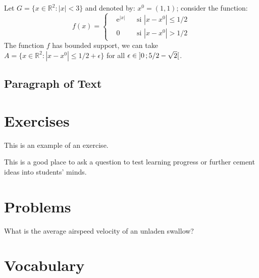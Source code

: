 \documentclass[11pt,fleqn]{book} %
\begin{document}
{\begin{example}
Let $G=\{x\in\mathbb{R}^2:|x|<3\}$ and denoted by: $x^0=(1,1)$; consider the function:
\begin{equation}
f(x)=\left\{\begin{aligned} & \mathrm{e}^{|x|} & & \text{si $|x-x^0|\leq 1/2$}\\
& 0 & & \text{si $|x-x^0|> 1/2$}\end{aligned}\right.
\end{equation}
The function $f$ has bounded support, we can take $A=\{x\in\mathbb{R}^2:|x-x^0|\leq 1/2+\epsilon\}$ for all $\epsilon\in\mathopen{]}0\,;5/2-\sqrt{2}\mathclose{[}$.
\end{example}

\subsection{Paragraph of Text}

\begin{example}
\lipsum[2]
\end{example}


\section{Exercises}

This is an example of an exercise.

\begin{exercise}
This is a good place to ask a question to test learning progress or further cement ideas into students' minds.
\end{exercise}


\section{Problems}

\begin{problem}
What is the average airspeed velocity of an unladen swallow?
\end{problem}


\section{Vocabulary}

}
\end{document}
